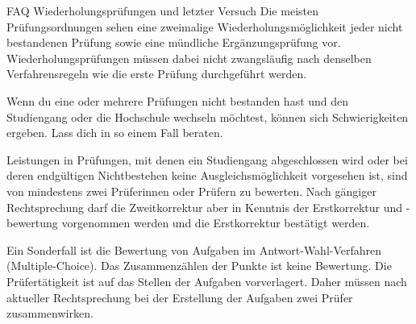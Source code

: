 \begin{artikel}{FAQ Wiederholungsprüfungen und letzter Versuch}
Die meisten Prüfungsordnungen sehen eine zweimalige Wiederholungsmöglichkeit jeder nicht bestandenen Prüfung sowie eine mündliche Ergänzungsprüfung vor. Wiederholungsprüfungen müssen dabei nicht zwangsläufig nach denselben Verfahrensregeln wie die erste Prüfung durchgeführt werden.

Wenn du eine oder mehrere Prüfungen nicht bestanden hast und den Studiengang oder die Hochschule wechseln möchtest, können sich Schwierigkeiten ergeben. Lass dich in so einem Fall beraten.

Leistungen in Prüfungen, mit denen ein Studiengang abgeschlossen wird oder bei deren endgültigen Nichtbestehen keine Ausgleichsmöglichkeit vorgesehen ist, sind von mindestens zwei Prüferinnen oder Prüfern zu bewerten. Nach gängiger Rechtsprechung darf die Zweitkorrektur aber in Kenntnis der Erstkorrektur und -bewertung vorgenommen werden und die Erstkorrektur bestätigt werden.

Ein Sonderfall ist die Bewertung von Aufgaben im Antwort-Wahl-Verfahren (Multiple-Choice). Das Zusammenzählen der Punkte ist keine Bewertung. Die Prüfertätigkeit ist auf das Stellen der Aufgaben vorverlagert. Daher müssen nach aktueller Rechtsprechung bei der Erstellung der Aufgaben zwei Prüfer zusammenwirken.
\end{artikel}
